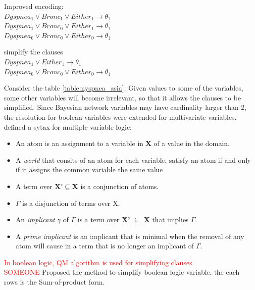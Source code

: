         \begin{multicols}{2}
        \centering
        \noindent Improved encoding:\\
        $Dyspnea_{1} \vee Bronc_{1} \vee Either_{1} \rightarrow \theta_{1}$\\
        $Dyspnea_{1} \vee Bronc_{0} \vee Either_{1} \rightarrow \theta_{1}$\\
        $Dyspnea_{0} \vee Bronc_{0} \vee Either_{0} \rightarrow \theta_{1}$\\

        \columnbreak
        
        \noindent simplify the clauses\\
        $Dyspnea_{1} \vee Either_{1} \rightarrow \theta_{1}$\\
        $Dyspnea_{0} \vee Bronc_{0} \vee Either_{0} \rightarrow \theta_{1}$\\
        \end{multicols}
        Consider the table \ref{table:nyspnea_asia}. Given values to some of the variables, some other variables will become irrelevant, so that it allows the clauses to be simplified. Since Bayesian network variables may have cardinality larger than 2, the resolution for boolean variables were extended for multi\-variate variables.\\
        
        \cite{2006-enc3} defined a sytax for multiple variable logic:
        \begin{itemize}
        \item An atom is an assignment to a variable in \textbf{X} of a value in the domain.
        \item A \textit{world} that consits of an atom for each variable, satisfy an atom if and only if it assigns the common variable the same value
        \item A term over $\textbf{X}' \subseteq \textbf{X}$ is a conjunction of atoms.
        \item $\Gamma$ is a disjunction of terms over X.
        \item An \textit{implicant} $\gamma$ of $\Gamma$ is a term over \textbf{X'} $\subseteq$ \textbf{X} that implies $\Gamma$.
        \item A \textit{prime implicant} is an implicant that is minimal when the removal of any atom will cause in a term that is no longer an implicant of $\Gamma$.
        \end{itemize}
        
        \textcolor{red}{In boolean logic, QM algorithm is used for simplifying clauses}\\
        \textcolor{red}{SOMEONE} Proposed the method to simplify boolean logic variable. the each rows is the Sum-of-product form.\\
        
